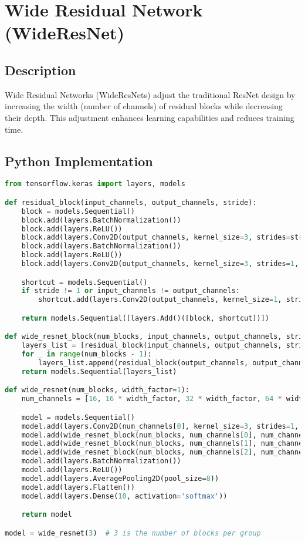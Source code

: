 \chapter{Wide Residual Network (WideResNet)}

\section{Description}
Wide Residual Networks (WideResNets) adjust the traditional ResNet design by increasing the width (number of channels) of residual blocks while decreasing their depth. This adjustment enhances learning capabilities and reduces training time.

\section{Python Implementation}
\begin{lstlisting}[language=Python]
from tensorflow.keras import layers, models

def residual_block(input_channels, output_channels, stride):
    block = models.Sequential()
    block.add(layers.BatchNormalization())
    block.add(layers.ReLU())
    block.add(layers.Conv2D(output_channels, kernel_size=3, strides=stride, padding='same'))
    block.add(layers.BatchNormalization())
    block.add(layers.ReLU())
    block.add(layers.Conv2D(output_channels, kernel_size=3, strides=1, padding='same'))

    shortcut = models.Sequential()
    if stride != 1 or input_channels != output_channels:
        shortcut.add(layers.Conv2D(output_channels, kernel_size=1, strides=stride, padding='same'))

    return models.Sequential([layers.Add()([block, shortcut])])

def wide_resnet_block(num_blocks, input_channels, output_channels, stride):
    layers_list = [residual_block(input_channels, output_channels, stride)]
    for _ in range(num_blocks - 1):
        layers_list.append(residual_block(output_channels, output_channels, 1))
    return models.Sequential(layers_list)

def wide_resnet(num_blocks, width_factor=1):
    num_channels = [16, 16 * width_factor, 32 * width_factor, 64 * width_factor]

    model = models.Sequential()
    model.add(layers.Conv2D(num_channels[0], kernel_size=3, strides=1, padding='same'))
    model.add(wide_resnet_block(num_blocks, num_channels[0], num_channels[1], 1))
    model.add(wide_resnet_block(num_blocks, num_channels[1], num_channels[2], 2))
    model.add(wide_resnet_block(num_blocks, num_channels[2], num_channels[3], 2))
    model.add(layers.BatchNormalization())
    model.add(layers.ReLU())
    model.add(layers.AveragePooling2D(pool_size=8))
    model.add(layers.Flatten())
    model.add(layers.Dense(10, activation='softmax'))

    return model

model = wide_resnet(3)  # 3 is the number of blocks per group
\end{lstlisting}

